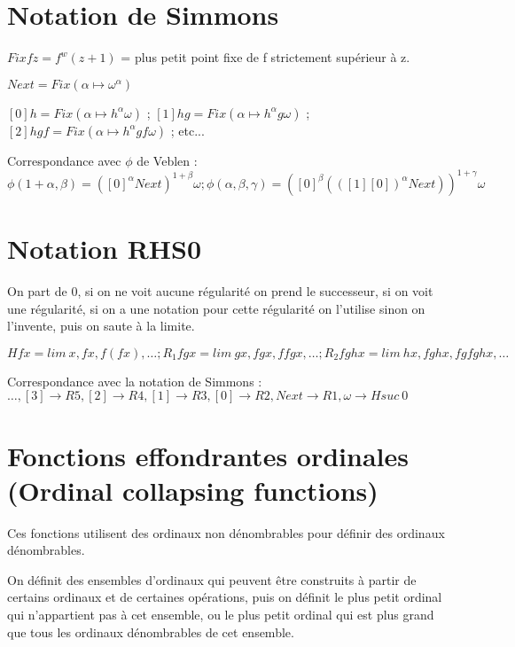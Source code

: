 \documentclass[8pt]{article}
\begin{document}
\section{Notation de Simmons}
\vspace{-0.4cm}
\( Fix f z = f^w(z+1)\) = plus petit point fixe de f strictement supérieur à z.

\( Next = Fix (\alpha \mapsto \omega^\alpha) \)

\( [0] h = Fix (\alpha \mapsto h^\alpha \omega) \) ;
\( [1] h g = Fix (\alpha \mapsto h^\alpha g \omega) \) ;
\( [2] h g f = Fix (\alpha \mapsto h^\alpha g f \omega) \) ; etc...

Correspondance avec \(\phi\) de Veblen : \( \phi(1+\alpha,\beta) = ([0]^\alpha Next)^{1+\beta} \omega ; 
 \phi(\alpha,\beta,\gamma) = ([0]^\beta (([1] [0])^\alpha Next))^{1+\gamma} \omega \)

\vspace{-0.6cm}

\section{Notation RHS0}
\vspace{-0.4cm}
On part de 0, si on ne voit aucune régularité on prend le successeur, si on voit une régularité, si on a une notation pour cette régularité on l'utilise sinon on l'invente, puis on saute à la limite.

\( H f x = lim\ x, f x, f (f x), \ldots ; R_1 f g x = lim\ g x, f g x, f f g x, \ldots ; R_2 f g h x = lim\ h x, f g h x, f g f g h x, \ldots \)

Correspondance avec la notation de Simmons : 
\( \ldots, [3] \rightarrow R5, [2] \rightarrow R4, [1] \rightarrow R3, [0] \rightarrow R2, Next \rightarrow R1, \omega \rightarrow H suc\ 0 \)

\vspace{-0.6cm}

\section{Fonctions effondrantes ordinales (Ordinal collapsing functions)}
\vspace{-0.4cm}
Ces fonctions utilisent des ordinaux non dénombrables pour définir des ordinaux dénombrables. 

On définit des ensembles d'ordinaux qui peuvent être construits à partir de certains ordinaux et de certaines opérations, puis on définit le plus petit ordinal qui n'appartient pas à cet ensemble, ou le plus petit ordinal qui est plus grand que tous les ordinaux dénombrables de cet ensemble.
\end{document}
